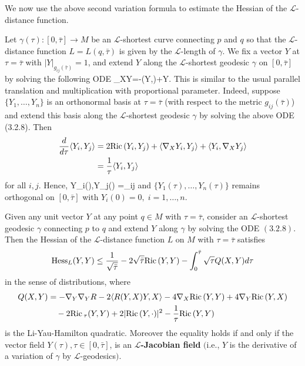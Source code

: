 We now use the above second variation formula to estimate the
Hessian of the $\mathcal{L}$-distance function.

Let $\gamma(\tau):[0,\bar{\tau}]\rightarrow M$ be an
$\mathcal{L}$-shortest curve connecting $p$ and $q$ so that the
$\mathcal{L}$-distance function $L=L(q,\bar\tau)$ is given by the
$\mathcal{L}$-length of $\gamma$. We fix a vector $Y$ at
$\tau=\bar{\tau}$ with $|Y|_{g_{ij}(\bar \tau)}=1$, and extend $Y$
along the $\mathcal{L}$-shortest geodesic $\gamma$ on
$[0,\bar{\tau}]$ by solving the following ODE \be
\nabla_XY=-\Ric(Y,\cdot)+Y.  %
\ee This is similar to the usual parallel translation and
multiplication with proportional parameter. Indeed, suppose
$\{Y_1,\ldots,Y_n\}$ is an orthonormal basis at $\tau=\bar{\tau}$
(with respect to the metric $g_{ij}(\bar \tau)$) and extend this
basis along the $\mathcal{L}$-shortest geodesic $\gamma$ by
solving the above ODE (3.2.8). Then
\begin{align*}
\frac{d}{d\tau}\langle Y_i,Y_j\rangle
&  = 2{\rm Ric}\,(Y_i,Y_j)+\langle\nabla_XY_i,Y_j\rangle+\langle Y_i,\nabla_XY_j\rangle\\
&  = \frac{1}{\tau}\langle Y_i,Y_j\rangle
\end{align*}
for all $i,j$. Hence, \be \<Y_i(\tau),Y_j(\tau)\>
=\frac{\tau}{\bar{\tau}}\delta_{ij}%
\ee and $\{Y_1(\tau),\ldots,Y_n(\tau)\}$ remains orthogonal on
$[0,\bar{\tau}]$ with $Y_i(0)=0,\;i=1,\ldots,n$.

\begin{proposition}
  \label{prop:cz-l-jacobi-comparison-inequality}
Given any unit vector $Y$ at any point $q \in M$ with
$\tau=\bar{\tau}$, consider an $\mathcal{L}$-shortest geodesic
$\gamma$ connecting $p$ to $q$ and extend $Y$ along $\gamma$ by
solving the {\rm ODE} $(3.2.8)$. Then the Hessian of the
$\mathcal{L}$-distance function $L$ on $M$ with $\tau=\bar{\tau}$
satisfies
$$
{\rm
Hess}_L(Y,Y)\leq\frac{1}{\sqrt{\bar{\tau}}}-2\sqrt{\bar{\tau}}{\rm Ric}\,(Y,Y)
-\int_0^{\bar{\tau}}\sqrt{{\tau}}Q(X,Y)d\tau
$$
in the sense of distributions, where
\begin{align*}
Q(X,Y)&  = -\nabla_Y\nabla_YR-2\langle R(Y,X)Y,X\rangle
-4\nabla_X {\rm Ric}\,(Y,Y)+4\nabla_Y {\rm Ric}\,(Y,X)\\
&\quad -2{\rm Ric}\,_\tau(Y,Y)+2|{\rm Ric}\,(Y,\cdot)|^2-\frac{1}{\tau}{\rm Ric}\,(Y,Y)
\end{align*}
is the Li-Yau-Hamilton quadratic. Moreover the equality holds if
and only if the vector field $Y(\tau),\tau\in[0,\bar{\tau}]$, is
an {\bf $\mathcal{L}$-Jacobian field} $($i.e., $Y$ is the
derivative of a variation of $\gamma$ by
$\mathcal{L}$-geodesics$)$.
\end{proposition}

